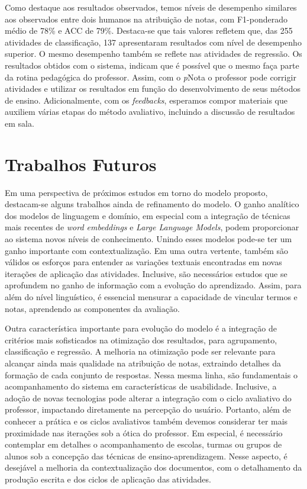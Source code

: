 Como destaque aos resultados observados, temos níveis de desempenho similares aos observados entre dois humanos na atribuição de notas, com F1-ponderado médio de 78\% e ACC de 79\%. Destaca-se que tais valores refletem que, das 255 atividades de classificação, 137 apresentaram resultados com nível de desempenho superior. O mesmo desempenho também se reflete nas atividades de regressão. Os resultados obtidos com o sistema, indicam que é possível que o mesmo faça parte da rotina pedagógica do professor. Assim, com o \textit{p}Nota o professor pode corrigir atividades e utilizar os resultados em função do desenvolvimento de seus métodos de ensino. Adicionalmente, com os \textit{feedbacks}, esperamos compor materiais que auxiliem várias etapas do método avaliativo, incluindo a discussão de resultados em sala.

\section{Trabalhos Futuros}

Em uma perspectiva de próximos estudos em torno do modelo proposto, destacam-se alguns trabalhos ainda de refinamento do modelo. O ganho analítico dos modelos de linguagem e domínio, em especial com a integração de técnicas mais recentes de \textit{word embeddings} e \textit{Large Language Models}, podem proporcionar ao sistema novos níveis de conhecimento. Unindo esses modelos pode-se ter um ganho importante com contextualização. Em uma outra vertente, também são válidos os esforços para entender as variações textuais encontradas em novas iterações de aplicação das atividades. Inclusive, são necessários estudos que se aprofundem no ganho de informação com a evolução do aprendizado. Assim, para além do nível linguístico, é essencial mensurar a capacidade de vincular termos e notas, aprendendo as componentes da avaliação.

Outra característica importante para evolução do modelo é a integração de critérios mais sofisticados na otimização dos resultados, para agrupamento, classificação e regressão. A melhoria na otimização pode ser relevante para alcançar ainda mais qualidade na atribuição de notas, extraindo detalhes da formação de cada conjunto de respostas. Nessa mesma linha, são fundamentais o acompanhamento do sistema em características de usabilidade. Inclusive, a adoção de novas tecnologias pode alterar a integração com o ciclo avaliativo do professor, impactando diretamente na percepção do usuário. Portanto, além de conhecer a prática e os ciclos avaliativos também devemos considerar ter mais proximidade nas iterações sob a ótica do professor. Em especial, é necessário contemplar em detalhes o acompanhamento de escolas, turmas ou grupos de alunos sob a concepção das técnicas de ensino-aprendizagem. Nesse aspecto, é desejável a melhoria da contextualização dos documentos, com o detalhamento da produção escrita e dos ciclos de aplicação das atividades.